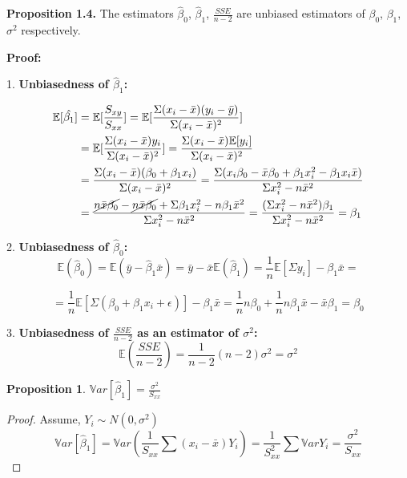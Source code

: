 \documentclass[12pt,a4paper,oneside]{book} %
\newtheorem{proposition}[theorem]{Proposition}
\begin{document}
\textbf{Proposition 1.4.} The estimators $\hat{\beta}_0$, $\hat{\beta}_1$, $\frac{SSE}{n-2}$ are unbiased estimators of $\beta_0$, $\beta_1$, $\sigma^2$ respectively.



\textbf{Proof:}

1. \textbf{Unbiasedness of $\hat{\beta}_1$:}


\begin{align*}
	\mathbb{E} [ \hat{\beta _1} ] &= \mathbb{E} [\frac{S_{xy}}{S_{xx}}] = \mathbb{E} [\frac{\Sigma (x_i - \bar{x})(y_i-\bar{y})}{\Sigma (x_i-\bar{x})^2}] \\
		&= \mathbb{E} [\frac{\Sigma (x_i - \bar{x})y_i}{\Sigma (x_i-\bar{x})^2}]=
	\frac{\Sigma (x_i - \bar{x})\mathbb{E} [y_i]}{\Sigma (x_i-\bar{x})^2}\\
		&= \frac{\Sigma (x_i - \bar{x})(\beta_0+\beta_1x_i)}{\Sigma (x_i-\bar{x})^2}=	
	\frac{\Sigma (x_i \beta_0 - \bar{x}\beta_0+\beta_1x_i^2-\beta_1x_i\bar{x})}{\Sigma x_i^2-n\bar{x}^2}\\
		&= \frac{\cancel{n\bar{x}\beta_0}-\cancel{n\bar{x}\beta_0}+\Sigma\beta_1x_i^2-n\beta_1\bar{x}^2}{\Sigma x_i^2-n\bar{x}^2}= \frac{(\Sigma x_i^2-n\bar{x}^2)\beta_1}{\Sigma x_i^2-n\bar{x}^2} = \beta_1 
\end{align*}


2. \textbf{Unbiasedness of $\hat{\beta}_0$:}
\[
\mathbb{E}(\hat{\beta}_0) = \mathbb{E}(\bar{y} - \hat{\beta}_1 \bar{x}) = \bar{y} - \bar{x} \mathbb{E}(\hat{\beta}_1) = \frac{1}{n}\mathbb{E}[\Sigma y_i]-\beta_1 \bar{x} =
\] 

\[
	= \frac{1}{n}\mathbb{E}[\Sigma (\beta_0+\beta_1x_i+\epsilon)]-\beta_1 \bar{x} 
	= \frac{1}{n}n\beta_0+\frac{1}{n}n\beta_1\bar{x}-\bar{x}\beta_1=\beta_0	
\]


3. \textbf{Unbiasedness of $\frac{SSE}{n-2}$ as an estimator of $\sigma^2$:}
\[
\mathbb{E}\left(\frac{SSE}{n-2}\right) = \frac{1}{n-2} (n - 2) \sigma^2 = \sigma^2
\]


\begin{proposition}
	$\mathbb{V}ar[\hat{\beta}_1] = \frac{\sigma^2}{S_{xx}}$
\end{proposition}

\begin{proof}
	Assume, $Y_i \sim N(0, \sigma^2) $
	\[
		\mathbb{V}ar[\hat{\beta}_1] = \mathbb{V}ar (\frac{1}{S_{xx}}\sum (x_i-\bar{x})Y_i) = \frac{1}{S_{xx}^2}\sum \mathbb{V}ar Y_i = \frac{\sigma^2}{S_{xx}}
	\]
\end{proof}
\end{document}

